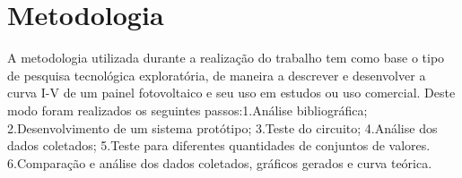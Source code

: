 \section{Metodologia}

A metodologia utilizada durante a realização do trabalho tem como base o tipo de pesquisa tecnológica exploratória, de maneira a descrever e desenvolver a curva I-V de um painel fotovoltaico e seu uso em estudos ou uso comercial. Deste modo foram realizados os seguintes passos:1.Análise bibliográfica; 2.Desenvolvimento de um sistema protótipo; 3.Teste do circuito; 4.Análise dos dados coletados; 5.Teste para diferentes quantidades de conjuntos de valores. 6.Comparação e análise dos dados coletados, gráficos gerados e curva teórica.
